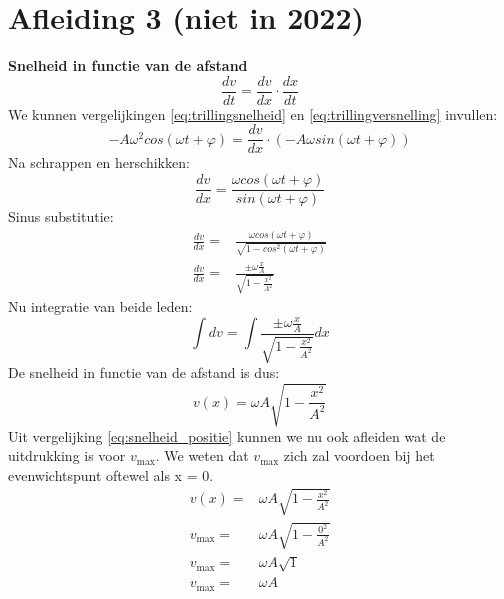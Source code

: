 \documentclass[a4paper,kul]{kulakarticle} %
\begin{document}
\section{Afleiding 3 (niet in 2022)}
\textbf{Snelheid in functie van de afstand}
\begin{equation*}
	\frac{dv}{dt} = \frac{dv}{dx}\cdot\frac{dx}{dt}
\end{equation*}
We kunnen vergelijkingen \ref{eq:trillingsnelheid} en \ref{eq:trillingversnelling} invullen:
\begin{equation*}
	-A\omega^2cos(\omega t + \varphi) = \frac{dv}{dx}\cdot (-A\omega sin(\omega t +\varphi))
\end{equation*}
Na schrappen en herschikken:
\begin{equation*}
	\frac{dv}{dx} = \frac{\omega cos(\omega t + \varphi)}{sin(\omega t + \varphi)}
\end{equation*}
Sinus substitutie:
\begin{align*}
	\frac{dv}{dx} =& \frac{\omega cos(\omega t + \varphi)}{\sqrt{1-cos^2(\omega t + \varphi)}}\\
	\frac{dv}{dx} =& \frac{\pm \omega \frac{x}{A}}{\sqrt{1-\frac{x^2}{A^2}}}
\end{align*}
Nu integratie van beide leden:
\begin{equation*}
	\int dv = \int \frac{\pm \omega \frac{x}{A}}{\sqrt{1-\frac{x^2}{A^2}}} dx
\end{equation*}
De snelheid in functie van de afstand is dus:
\begin{equation}
	\label{eq:snelheid_positie}
	v(x) = \omega A\sqrt{1-\frac{x^2}{A^2}}
\end{equation}
Uit vergelijking \ref{eq:snelheid_positie} kunnen we nu ook afleiden wat de uitdrukking is voor $v_{\text{max}}$. We weten dat $v_{\text{max}}$ zich zal voordoen bij het evenwichtspunt oftewel als x = 0.
\begin{align*}
	v(x) =& \omega A\sqrt{1-\frac{x^2}{A^2}}\\
	v_{\text{max}} =& \omega A\sqrt{1-\frac{0^2}{A^2}}\\
	v_{\text{max}} =& \omega A\sqrt{1}\\
	v_{\text{max}} =& \omega A
\end{align*}
\newpage
\end{document}

